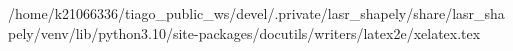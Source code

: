 /home/k21066336/tiago_public_ws/devel/.private/lasr_shapely/share/lasr_shapely/venv/lib/python3.10/site-packages/docutils/writers/latex2e/xelatex.tex